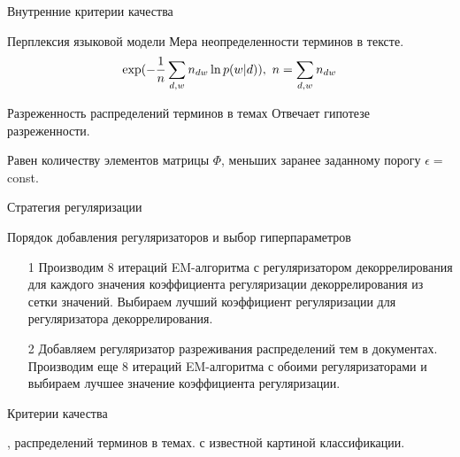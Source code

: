 \documentclass{beamer}
\begin{document}
\begin{frame}{Внутренние критерии качества}
\begin{block}{Перплексия языковой модели}
	Мера неопределенности терминов в тексте.
\begin{align*}
 \exp(-{1\over{n}}\sum\limits_{d,w} {n_{dw}}\ln p(w|d)),~n=\sum\limits_{d,w}{n_{dw}}
\end{align*} 
    \end{block}
\begin{block}{Разреженность распределений терминов в темах}
	Отвечает гипотезе разреженности.
	
Равен количеству элементов матрицы $\Phi$, меньших заранее заданному порогу $\epsilon=$ const.
    \end{block}
\end{frame}
\begin{frame}{Стратегия регуляризации}
\begin{block}{Порядок добавления регуляризаторов и выбор гиперпараметров}
    \begin{itemize}
        \item[1] Производим 8 итераций EM-алгоритма с регуляризатором декоррелирования для каждого значения коэффициента регуляризации декоррелирования из сетки значений. Выбираем лучший коэффициент регуляризации для регуляризатора декоррелирования.
        \item[2] Добавляем регуляризатор разреживания распределений тем в документах. Производим еще 8 итераций EM-алгоритма с обоими регуляризаторами и выбираем лучшее значение коэффициента регуляризации.
    \end{itemize} 
    \end{block}
\begin{block}{Критерии качества}
\begin{itemize}
 , 
 распределений терминов в темах.
 с известной картиной классификации.
    \end{itemize} 
\end{block}
\end{frame}
\end{document}
